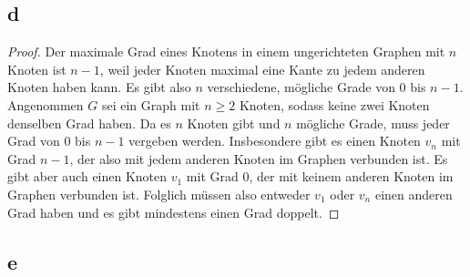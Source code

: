 \documentclass[a4paper,10pt]{article}
\begin{document}
\subsection*{d}

\begin{proof}
 Der maximale Grad eines Knotens in einem ungerichteten Graphen mit $n$ Knoten ist $n - 1$, weil jeder Knoten maximal eine Kante zu jedem anderen Knoten haben kann.
 Es gibt also $n$ verschiedene, mögliche Grade von $0$ bis $n - 1$.
 Angenommen $G$ sei ein Graph mit $n \ge 2$ Knoten, sodass keine zwei Knoten denselben Grad haben.
 Da es $n$ Knoten gibt und $n$ mögliche Grade, muss jeder Grad von $0$ bis $n - 1$ vergeben werden.
 Insbesondere gibt es einen Knoten $v_n$ mit Grad $n - 1$, der also mit jedem anderen Knoten im Graphen verbunden ist.
 Es gibt aber auch einen Knoten $v_1$ mit Grad $0$, der mit keinem anderen Knoten im Graphen verbunden ist.
 Folglich müssen also entweder $v_1$ oder $v_n$ einen anderen Grad haben und es gibt mindestens einen Grad doppelt.
\end{proof}

\subsection*{e}
\end{document}
